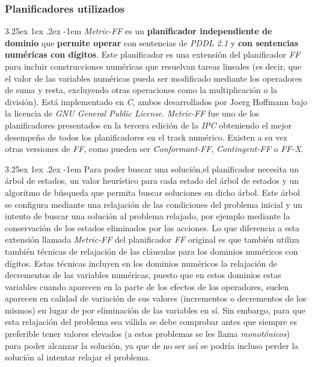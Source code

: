 \documentclass{article}
\makeatletter
\newcounter{subsubsubsection}
\renewcommand\paragraph{\@startsection{paragraph}{5}{\z@}%
      {3.25ex \@plus1ex \@minus.2ex}%
      {-1em}%
      {\normalfont\normalsize\bfseries}}
\makeatother
\begin{document}
    
            \subsubsection{Planificadores utilizados}
    
                \setcounter{subsubsubsection}{0}
    \paragraph{}
    \textit{Metric-FF}\cite{mff} es un \textbf{planificador independiente de dominio} que \textbf{permite operar} con sentencias de \textit{PDDL 2.1} y \textbf{con sentencias numéricas con dígitos}. Este planificador es una extensión del planificador \textit{FF} para incluir construcciones numéricas\cite{ff1} que resuelvan tareas lineales (es decir, que el valor de las variables numéricas pueda ser modificado mediante los operadores de suma y resta, excluyendo otras operaciones como la multiplicación o la división). Está implementado en \textit{C}, ambos desarrollados por Joerg Hoffmann bajo la licencia de \textit{GNU General Public License}. \textit{Metric-FF} fue uno de los planificadores presentados en la tercera edición de la \textit{IPC} obteniendo el mejor desempeño de todos los planificadores en el track numérico\cite{mffIPC3}. Existen a su vez otras versiones de \textit{FF}, como pueden ser \textit{Conformant-FF}, \textit{Contingent-FF}\cite{conformant} o \textit{FF-X}.
    
    \paragraph{}
    Para poder buscar una solución,el planificador necesita un árbol de estados, un valor heurístico para cada estado del árbol de estados y un algoritmo de búsqueda que permita buscar soluciones en dicho árbol. Este árbol se configura mediante una relajación de las condiciones del problema inicial y un intento de buscar una solución al problema relajado, por ejemplo mediante la conservación de los estados eliminados por las acciones. Lo que diferencia a esta extensión llamada \textit{Metric-FF} del planificador \textit{FF} original es que también utiliza también técnicas de relajación de las cláusulas para los dominios numéricos con dígitos. Estas técnicas incluyen en los dominios numéricos la relajación de decrementos de las variables numéricas, puesto que en estos dominios estas variables cuando aparecen en la parte de los efectos de los operadores, suelen aparecen en calidad de variación de sus valores (incrementos o decrementos de los mismos) en lugar de por eliminación de las variables en sí. Sin embargo, para que esta relajación del problema sea válida se debe comprobar antes que siempre es preferible tener valores elevados (a estos problemas se les llama \textit{monotónicos}) para poder alcanzar la solución, ya que de no ser así se podría incluso perder la solución al intentar relajar el problema.
    
\end{document}
